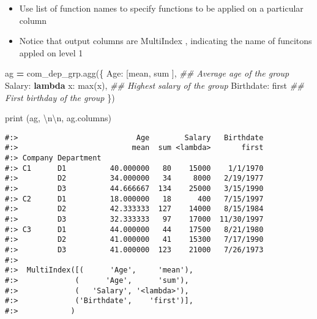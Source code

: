 \documentclass[
]{book}
\newenvironment{Shaded}{\begin{snugshade}}{\end{snugshade}}
\newcommand{\BuiltInTok}[1]{#1}
\newcommand{\CharTok}[1]{\textcolor[rgb]{0.5,0.5,0.5}{#1}}
\newcommand{\CommentTok}[1]{\textcolor[rgb]{0.37,0.37,0.37}{\textit{#1}}}
\newcommand{\KeywordTok}[1]{\textcolor[rgb]{0.27,0.27,0.27}{\textbf{#1}}}
\newcommand{\NormalTok}[1]{#1}
\newcommand{\OperatorTok}[1]{\textcolor[rgb]{0.43,0.43,0.43}{\textbf{#1}}}
\newcommand{\StringTok}[1]{\textcolor[rgb]{0.5,0.5,0.5}{#1}}
\providecommand{\tightlist}{%
  \setlength{\itemsep}{0pt}\setlength{\parskip}{0pt}}
\begin{document}
\begin{itemize}
\tightlist
\item
  Use list of function names to specify functions to be applied on a particular column\\
\item
  Notice that output columns are MultiIndex , indicating the name of funcitons appled on level 1
\end{itemize}

\begin{Shaded}
\begin{Highlighting}[]
\NormalTok{ag }\OperatorTok{=}\NormalTok{ com\_dep\_grp.agg(\{}
      \StringTok{\textquotesingle{}Age\textquotesingle{}}\NormalTok{: [}\StringTok{\textquotesingle{}mean\textquotesingle{}}\NormalTok{, }\BuiltInTok{sum}\NormalTok{ ],       }\CommentTok{\#\# Average age of the group}
      \StringTok{\textquotesingle{}Salary\textquotesingle{}}\NormalTok{: }\KeywordTok{lambda}\NormalTok{ x: }\BuiltInTok{max}\NormalTok{(x),  }\CommentTok{\#\# Highest salary of the group}
      \StringTok{\textquotesingle{}Birthdate\textquotesingle{}}\NormalTok{: }\StringTok{\textquotesingle{}first\textquotesingle{}}         \CommentTok{\#\# First birthday of the group}
\NormalTok{    \})}
    
\BuiltInTok{print}\NormalTok{ (ag, }\StringTok{\textquotesingle{}}\CharTok{\textbackslash{}n\textbackslash{}n}\StringTok{\textquotesingle{}}\NormalTok{, ag.columns)}
\end{Highlighting}
\end{Shaded}

\begin{verbatim}
#:>                           Age        Salary   Birthdate
#:>                          mean  sum <lambda>       first
#:> Company Department                                     
#:> C1      D1          40.000000   80    15000    1/1/1970
#:>         D2          34.000000   34     8000   2/19/1977
#:>         D3          44.666667  134    25000   3/15/1990
#:> C2      D1          18.000000   18      400   7/15/1997
#:>         D2          42.333333  127    14000   8/15/1984
#:>         D3          32.333333   97    17000  11/30/1997
#:> C3      D1          44.000000   44    17500   8/21/1980
#:>         D2          41.000000   41    15300   7/17/1990
#:>         D3          41.000000  123    21000   7/26/1973 
#:> 
#:>  MultiIndex([(      'Age',     'mean'),
#:>             (      'Age',      'sum'),
#:>             (   'Salary', '<lambda>'),
#:>             ('Birthdate',    'first')],
#:>            )
\end{verbatim}
\end{document}

